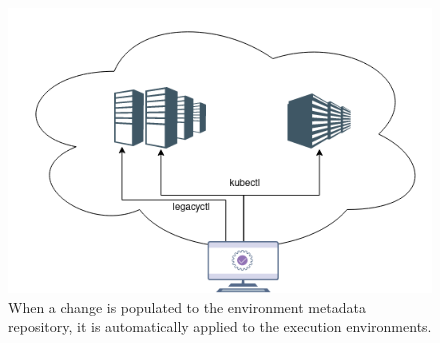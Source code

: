 \documentclass[../main.tex]{subfiles}
\begin{document}
    \begin{figure}[h]
        \centering
        \includegraphics[width=.9\linewidth]{img/impl_idea_deployer_v2.png}
        \captionsetup{justification=centering}
        \caption{
            When a change is populated to the environment metadata repository, it is automatically applied to the execution environments.
        }
        \label{fig:impl_deployer}
    \end{figure}
\end{document}
